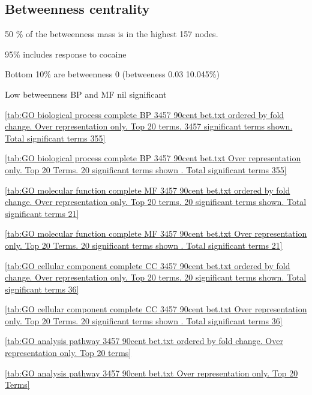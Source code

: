 \subsection{Betweenness centrality}

50 \% of the betweenness mass is in the highest 157 nodes. 

95\% includes response to cocaine

Bottom 10\% are betweenness 0 (betweeness 0.03 10.045\%)

Low betweenness
BP and MF nil significant


\ref{tab:GO biological process complete BP 3457 90cent bet.txt ordered by fold change. Over representation only. Top 20 terms. 3457 significant terms shown. Total significant terms 355}

\ref{tab:GO biological process complete BP 3457 90cent bet.txt Over representation only. Top 20 Terms. 20 significant terms shown . Total significant terms 355}

\ref{tab:GO molecular function complete MF 3457 90cent bet.txt ordered by fold change. Over representation only. Top 20 terms. 20 significant terms shown. Total significant terms 21}

\ref{tab:GO molecular function complete MF 3457 90cent bet.txt Over representation only. Top 20 Terms. 20 significant terms shown . Total significant terms 21}

\ref{tab:GO cellular component complete CC 3457 90cent bet.txt ordered by fold change. Over representation only. Top 20 terms. 20 significant terms shown. Total significant terms 36}

\ref{tab:GO cellular component complete CC 3457 90cent bet.txt Over representation only. Top 20 Terms. 20 significant terms shown . Total significant terms 36}

\ref{tab:GO analysis pathway 3457 90cent bet.txt ordered by fold change. Over representation only. Top 20 terms}

\ref{tab:GO analysis pathway 3457 90cent bet.txt Over representation only. Top 20 Terms}




